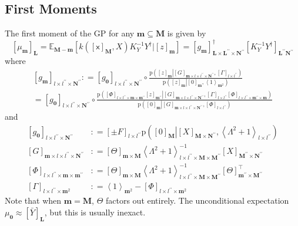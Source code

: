 \documentclass[preprint,12pt]{elsarticle}
\newcommand*{\M}[1]{\ensuremath{#1}\xspace}
\newcommand*{\x}{\times}
\newcommand*{\mi}[1]{\mathbf{#1}}
\newcommand*{\rv}[1]{\mathsf{#1}}
\newcommand*{\te}[2][]{\left\lbrack{#2}\right\rbrack_{#1}}
\newcommand*{\diag}[2][]{\left\langle{#2}\right\rangle_{#1}}
\newcommand*{\prob}[3]{\M{\mathrm{p}\!\left(\left.{#1}\right\vert{#2,#3}\right)}}
\newcommand*{\deq}{\M{\mathrel{\mathop:}=}}
\newcommand*{\ev}[3][]{\mathbb{E}_{#3}^{#1}\!\left\lbrack{#2}\right\rbrack}
\begin{document}
    \subsection{First Moments} \label{sub:GPMom:First}
        The first moment of the GP for any $\mi{m}\subseteq\mi{M}$ is given by
        \begin{equation*}
            \te[\mi{L}]{\mu_{\mi{m}}}
            = \ev{k\!\left(\te[\mi{M}]{\rv{x}},X\right) K_{Y}^{-1} Y^{\dagger} \big\vert \te[\mi{m}]{z}}{\mi{M-m}}
            = \te[\mi{L}\x\mi{L^{\prime\prime}}\x\mi{N^{\prime\prime}}]{g_{\mi{m}}}^{\dagger}
            \te[\mi{L^{\prime\prime}N^{\prime\prime}}]{K_{Y}^{-1} Y^{\dagger}}
        \end{equation*}
        where
        \begin{multline*}
            \te[l\x l^{\prime\prime}\x\mi{N^{\prime\prime}}]{g_{\mi{m}}}
            \deq \te[l\x l^{\prime\prime}\x\mi{N^{\prime\prime}}]{g_{\mi{0}}} \circ \frac
            {\prob{\te[\mi{m}]{z}}{\te[\mi{m}\x l\x l^{\prime\prime}\x\mi{N^{\prime\prime}}]{G}}{\te[l\x l^{\prime\prime}]{\Gamma}}}
            {\prob{\te[\mi{m}]{z}}{\te[\mi{m}]{0}}{\diag[\mi{m}^{2}]{1}}} \\
            = \te[l\x l^{\prime\prime}\x\mi{N^{\prime\prime}}]{g_{\mi{0}}} \circ 
            \frac{{\prob{\te[l\x l^{\prime\prime}\x\mi{m\x m^{\prime\prime}}]{\Phi}\te[\mi{m^{\prime\prime}}]{z}}{\te[\mi{m}\x l\x l^{\prime\prime}\x\mi{N^{\prime\prime}}]{G}}{\te[l\x l^{\prime\prime}]{\Gamma}\te[l\x l^{\prime\prime}\x \mi{m^{\prime\prime}\x m}]{\Phi}}}}
            {\prob{\te[\mi{m}]{0}}{\te[\mi{m}\x l\x l^{\prime\prime}\x\mi{N^{\prime\prime}}]{G}}
            {\te[l\x l^{\prime\prime}]{\Phi}}}
        \end{multline*}
        and
        \begin{equation*}
            \begin{aligned}
                \te[l\x l^{\prime\prime}\x\mi{N^{\prime\prime}}]{g_{\mi{0}}} 
                &\deq \te[l\x l^{\prime\prime}]{\pm F}
                \prob{\te[\mi{M}]{0}}{\te[\mi{M}\x\mi{N^{\prime\prime}}]{X}}
                {\diag[l\x l^{\prime\prime}]{\Lambda^{2}+1}} \\
                \te[\mi{m}\x l\x l^{\prime\prime}\x\mi{N^{\prime\prime}}]{G} &\deq 
                \te[\mi{m}\x\mi{M}]{\Theta} \diag[l\x l^{\prime\prime}\x\mi{M}\x\mi{M^{\prime\prime}}]{\Lambda^{2}+1}^{-1} \te[\mi{M^{\prime\prime}}\x\mi{N^{\prime\prime}}]{X} \\
                \te[l\x l^{\prime\prime}\x\mi{m}\x\mi{m^{\prime\prime}}]{\Phi} &\deq 
                \te[\mi{m}\x\mi{M}]{\Theta}
                \diag[l\x l^{\prime\prime}\x\mi{M}\x\mi{M^{\prime\prime}}]{\Lambda^{2}+1}^{-1} \te[\mi{m^{\prime\prime}}\x\mi{M^{\prime\prime}}]{\Theta}^{\intercal} \\
                \te[l\x l^{\prime\prime}\x\mi{m}^{2}]{\Gamma} &\deq 
                \diag[\mi{m}^{2}]{1} -
                \te[l\x l^{\prime\prime}\x\mi{m}^{2}]{\Phi}
            \end{aligned}
        \end{equation*}
        Note that when $\mi{m} = \mi{M}$, $\Theta$ factors out entirely.
        The unconditional expectation $\mu_{\mi{0}} \approx \te[\mi{L}]{\bar{Y}}$, but this is usually inexact.
\end{document}
